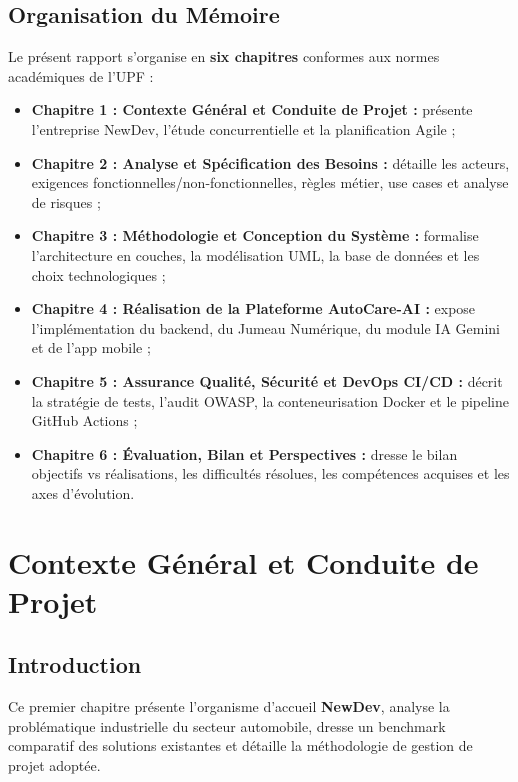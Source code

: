 \documentclass[12pt,a4paper,oneside]{report}
\newcommand{\bpuce}{\textcolor{midBlue}{$\blacktriangleright$}\;}
\begin{document}
\section*{Organisation du M\'emoire}
Le pr\'esent rapport s'organise en \textbf{six chapitres} conformes aux normes acad\'emiques de l'UPF :
\begin{itemize}[label=\bpuce]
  \item \textbf{Chapitre 1 : Contexte G\'en\'eral et Conduite de Projet :} pr\'esente l'entreprise NewDev, l'\'etude concurrentielle et la planification Agile ;
  \item \textbf{Chapitre 2 : Analyse et Sp\'ecification des Besoins :} d\'etaille les acteurs, exigences fonctionnelles/non-fonctionnelles, r\`egles m\'etier, use cases et analyse de risques ;
  \item \textbf{Chapitre 3 : M\'ethodologie et Conception du Syst\`eme :} formalise l'architecture en couches, la mod\'elisation UML, la base de donn\'ees et les choix technologiques ;
  \item \textbf{Chapitre 4 : R\'ealisation de la Plateforme AutoCare-AI :} expose l'impl\'ementation du backend, du Jumeau Num\'erique, du module IA Gemini et de l'app mobile ;
  \item \textbf{Chapitre 5 : Assurance Qualit\'e, S\'ecurit\'e et DevOps CI/CD :} d\'ecrit la strat\'egie de tests, l'audit OWASP, la conteneurisation Docker et le pipeline GitHub Actions ;
  \item \textbf{Chapitre 6 : \'Evaluation, Bilan et Perspectives :} dresse le bilan objectifs vs r\'ealisations, les difficult\'es r\'esolues, les comp\'etences acquises et les axes d'\'evolution.
\end{itemize}

\clearpage
\chapter{Contexte G\'en\'eral et Conduite de Projet}

\section{Introduction}
Ce premier chapitre pr\'esente l'organisme d'accueil \textbf{NewDev}, analyse la probl\'ematique industrielle du secteur automobile, dresse un benchmark comparatif des solutions existantes et d\'etaille la m\'ethodologie de gestion de projet adopt\'ee.
\end{document}
